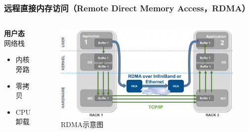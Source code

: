 \begin{frame}
	\frametitle{远程直接内存访问（Remote Direct Memory Access，RDMA）}
	\begin{columns}[onlytextwidth]
		\begin{block}{\textbf{用户态}网络栈}
			\begin{itemize}
				\item 内核旁路
				\item 零拷贝
				\item CPU卸载
			\end{itemize}
		\end{block}
		\vspace{1.5em}
		\begin{figure}
			\centering
			\includegraphics[width=\textwidth]{image/presentation/rdma.png}
			\caption{RDMA示意图}
			\label{fig:rdma}
		\end{figure}
	\end{columns}
\end{frame}

